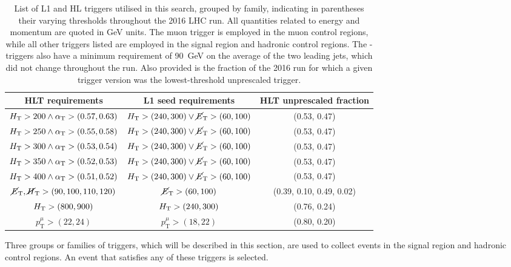 \begin{table}[h]
\footnotesize
\centering
\begin{tabular}{ccc}
\hline
HLT requirements & L1 seed requirements & HLT unprescaled fraction \\
\hline\hline
$\mbox{$H_\text{T}$}>200 \land \alpha_{\text{T}}>(0.57,0.63)$ & $\mbox{$H_\text{T}$}>(240,300) \lor 
\mbox{$\cancel{E}_\text{T}$}>(60,100)$ 
& (0.53, 0.47) \\
$\mbox{$H_\text{T}$}>250 \land \alpha_{\text{T}}>(0.55,0.58)$ & $\mbox{$H_\text{T}$}>(240,300) \lor 
\mbox{$\cancel{E}_\text{T}$}>(60,100)$ 
& (0.53, 0.47) \\
$\mbox{$H_\text{T}$}>300 \land \alpha_{\text{T}}>(0.53,0.54)$ & $\mbox{$H_\text{T}$}>(240,300) \lor 
\mbox{$\cancel{E}_\text{T}$}>(60,100)$ 
& (0.53, 0.47) \\
$\mbox{$H_\text{T}$}>350 \land \alpha_{\text{T}}>(0.52,0.53)$ & $\mbox{$H_\text{T}$}>(240,300) \lor 
\mbox{$\cancel{E}_\text{T}$}>(60,100)$ 
& (0.53, 0.47) \\
$\mbox{$H_\text{T}$}>400 \land \alpha_{\text{T}}>(0.51,0.52)$ & $\mbox{$H_\text{T}$}>(240,300) \lor 
\mbox{$\cancel{E}_\text{T}$}>(60,100)$ 
& (0.53, 0.47) \\
\hline
$\mbox{$\cancel{E}_\text{T}$}, \mbox{$\cancel{H}_\text{T}$}>(90,100,110,120)$ & $\mbox{$\cancel{E}_\text{T}$}>(60,100)$ & (0.39, 
0.10, 0.49, 0.02) \\
\hline
$\mbox{$H_\text{T}$}>(800,900)$ & $\mbox{$H_\text{T}$}>(240,300)$ & (0.76, 0.24) \\
\hline
$p_{\mathrm{T}}^{\mu}>(22,24)$ & $p_{\mathrm{T}}^{\mu}>(18,22)$ & (0.80, 0.20) 
\\
\hline
\end{tabular}
\caption{List of L1 and HL triggers utilised in this search, grouped by 
family, 
indicating in parentheses their varying thresholds throughout the 2016 LHC run. 
All quantities related to energy and momentum are quoted in GeV units.
The muon trigger is employed in the muon 
control regions, while all other triggers listed are employed in the signal 
region and hadronic control regions.
The \scalht-\alphat triggers also have a minimum requirement of 90~GeV on the 
average \pt of the two leading jets, which did not change throughout the run.
Also provided is the fraction of the 2016 run for which a given trigger version 
was the lowest-threshold unprescaled trigger.}
\label{tab:triggers}
\end{table}

Three groups or families of triggers, which will be described in this section, 
are used to collect events in the signal region and hadronic control regions. 
An event that satisfies any of these triggers is selected.

